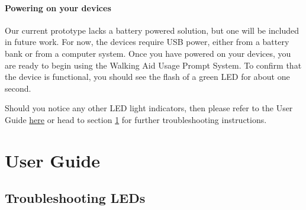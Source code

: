 				\paragraph{Powering on your devices}\mbox{}

				Our current prototype lacks a battery powered solution, but one will be included in future work. For now, the devices require USB power, either from a battery bank or from a computer system. Once you have powered on your devices, you are ready to begin using the Walking Aid Usage Prompt System. To confirm that the device is functional, you should see the flash of a green LED for about one second.

				Should you notice any other LED light indicators, then please refer to the User Guide \hyperref[sec:user_guide]{here} or head to section \ref{sec:user_guide} for further troubleshooting instructions.


	\section{User Guide}
	\label{sec:user_guide}

		\subsection{Troubleshooting LEDs}
		\label{subsec:troubleshooting_leds}

